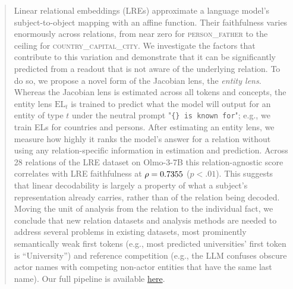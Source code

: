 \begin{abstract}
Linear relational embeddings (LREs) approximate a language
model's subject-to-object mapping with an affine
function. Their faithfulness varies enormously across
relations, from near zero for \textsc{person\_father} to
the ceiling for \textsc{country\_capital\_city}. We investigate
the factors that contribute to this variation and
demonstrate that it can be significantly predicted from a
readout that is not aware of the underlying relation. To
do so, we propose a novel form of the Jacobian lens, the
\emph{entity lens}. Whereas the Jacobian lens is estimated
across all tokens and concepts, the entity lens
$\mbox{EL}_t$
is trained
to predict what the model will output for an entity of
type $t$ under the neutral prompt "\texttt{\{\} is known for}"; e.g., we train ELs for countries and persons.
After estimating an entity lens, we measure how
highly it ranks the model's answer for a relation without
using any relation-specific information in estimation and
prediction.  Across 28 relations of the LRE dataset on
Olmo-3-7B this relation-agnostic score correlates with LRE
faithfulness at $\rho = \headlinenumber$  ($p < .01$).  This
suggests that linear decodability is largely a property of
what a subject's representation already carries, rather than
of the relation being decoded.
Moving the
unit of analysis from the relation to the individual fact,
we conclude that new relation datasets and analysis methods
are needed to address several problems in existing datasets,
most prominently semantically weak first tokens (e.g., most
predicted universities' first token is ``University'') and
reference competition (e.g., the LLM confuses obscure
actor names with competing non-actor entities that have the
same last name).
Our full pipeline is available \href{https://github.com/jonasrohw/entity-lens}{here}.
\end{abstract}
